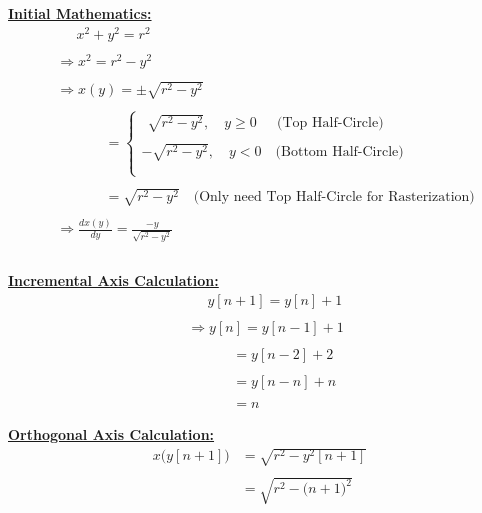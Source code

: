 \documentclass{article}
\begin{document}
\underline{\textbf{Initial Mathematics:}}
\begin{align*}
    &\quad \ \ x^{2} + y^{2} = r^{2} \\ \\
    &\Rightarrow x^{2} = r^{2} - y^{2} \\ \\
    &\Rightarrow x(y) = \pm\sqrt{r^{2} - y^{2}} \\ \\
    &\quad \quad \quad \ \ = \begin{cases}
                                \ \ \sqrt{r^{2} - y^{2}}, \quad y \geq 0 \quad \ \ \big(\text{Top Half-Circle}\big) \\ \\
                                -\sqrt{r^{2} - y^{2}}, \quad y < 0 \quad \big(\text{Bottom Half-Circle}\big) \\ \\ 
                               \end{cases} \\ \\
    &\quad \quad \quad \ \ = \sqrt{r^{2} - y^{2}} \quad \big(\text{Only need Top Half-Circle for Rasterization}\big) \\ \\
    &\Rightarrow \frac{dx(y)}{dy} = \frac{-y}{\sqrt{r^{2} - y^{2}}} \\ \\
\end{align*}

\underline{\textbf{Incremental Axis Calculation:}}
\begin{align*}
    &\quad \ \ y[n + 1] = y[n] + 1 \\ \\
    &\Rightarrow y[n] = y[n - 1] + 1 \\ \\
    &\quad \quad \quad \ = y[n - 2] + 2 \\ \\
    &\quad \quad \quad \ = y[n - n] + n \\ \\
    &\quad \quad \quad \ = n
\end{align*}

\underline{\textbf{Orthogonal Axis Calculation:}}
\begin{align*}
    x\Big(y[n + 1]\Big) &= \sqrt{r^{2} - y^{2}[n + 1]} \\ \\
                        &= \sqrt{r^{2} - \big(n + 1\big)^{2}} \\ \\
\end{align*}
\end{document}
